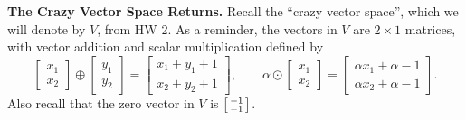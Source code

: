 \documentclass[]{exam}
\newenvironment{smallbmatrix}
{\left[\begin{smallmatrix}}
{\end{smallmatrix}\right]}
\begin{document}
\begin{questions}
	\question \textbf{The Crazy Vector Space Returns.} Recall the ``crazy vector space'', which we will denote by $V$, from HW 2. As a reminder, the vectors in $V$ are $2 \times 1$ matrices, with vector addition and scalar multiplication defined by
	\[
	\begin{bmatrix}
	x_1 \\ x_2
	\end{bmatrix}
	\oplus
	\begin{bmatrix}
	y_1 \\ y_2
	\end{bmatrix}
	=
	\begin{bmatrix}
	x_1+y_1+1 \\ x_2+y_2+1
	\end{bmatrix},
	\qquad
	\alpha
	\odot
	\begin{bmatrix}
	x_1 \\ x_2
	\end{bmatrix}
	=
	\begin{bmatrix}
	\alpha x_1 + \alpha - 1 \\
	\alpha x_2 + \alpha - 1
	\end{bmatrix}.
	\]
	Also recall that the zero vector in $V$ is $\begin{smallbmatrix} -1 \\ -1 \end{smallbmatrix}$.
	
	\begin{enumerate}[label=(\alph*)]
    
		
	\end{enumerate}
	
\end{questions}
\end{document}
